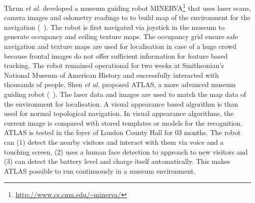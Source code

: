 Thrun \emph{et al.} developed a museum guiding robot 
MINERVA\footnote{\url{http://www.cs.cmu.edu/~minerva/}} that uses laser scans, camera images and 
odometry readings to to build map of the environment for 
the navigation (~\citet{thrun99}). The robot is first navigated 
via joystick in the museum to generate 
occupancy and ceiling texture maps. The occupancy 
grid ensure safe navigation and texture maps are used 
for localisation in case of a huge crowd because 
frontal images do not offer sufficient information for 
feature based tracking. The robot remained operational for two weeks 
at Smithsonian’s National Museum of American History 
and successfully interacted with thousands of people.
Shen \emph{et al.} proposed ATLAS, a more advanced 
museum guiding robot (~\citet{shen06}). 
The laser data and images are used 
to match the map data of the environment for localisation. 
A visual appearance based algorithm is than used for normal
topological navigation. In visual appearance algorithms, 
the current image is compared with stored templates or models 
for the recognition. ATLAS is tested in the foyer of London County
Hall for 03 months. The robot can (1) detect the nearby visitors 
and interact with them via voice and a touching screen, (2)
uses a human face detection to approach to new visitors
and (3) can detect the battery level and
charge itself automatically. This makes ATLAS possible to
run continuously in a museum environment.


